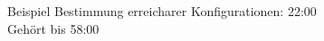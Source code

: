 \documentclass{article}
\begin{document}
Beispiel Bestimmung erreicharer Konfigurationen: 22:00 \\
Gehört bis 58:00
\end{document}
